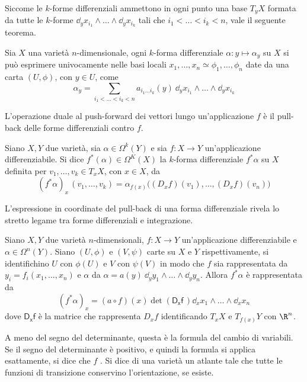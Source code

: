 Siccome le $k$-forme differenziali ammettono in ogni punto una base $T_y X$ formata da tutte le $k$-forme $\dd_y x_{i_1} \wedge \ldots \wedge \dd_y x_{i_k}$ tali che $i_1 < \ldots < i_k < n$, vale il seguente teorema.
\begin{theorem}
  Sia $X$ una varietà $n$-dimensionale, ogni $k$-forma differenziale $\alpha: y \mapsto \alpha_y$ su $X$ si può esprimere univocamente nelle basi locali $x_1, \ldots, x_n \simeq \phi_1, \ldots, \phi_n$ date da una carta $(U, \phi)$, con $y \in U$, come 
  \begin{equation*}
    \alpha_y = \sum_{i_1 < \ldots < i_k < n} a_{i_1\ldots i_k}(y)\ \dd_y x_{i_1} \wedge \ldots \wedge \dd_y x_{i_k}
  \end{equation*}
\end{theorem}

L'operazione duale al push-forward dei vettori lungo un'applicazione $f$ è il pull-back delle forme differenziali contro $f$.
\begin{definition}
  Siano $X,Y$ due varietà, sia $\alpha \in \Omega^k (Y)$ e sia $f:X\to Y$ un'applicazione differenziabile. Si dice  $f^*(\alpha) \in  \Omega^K(X)$ la $k$-forma differenziale $f^* \alpha$ su $X$ definita per $v_1, \ldots, v_k \in T_x X$, con $x \in X$, da \begin{equation*}
  (f^*\alpha)_x\, (v_1, \ldots, v_k) = \alpha_{f(x)}\big((D_x f)(v_1), \ldots, (D_x f)(v_n)\big)
  \end{equation*}  
\end{definition}

L'espressione in coordinate del pull-back di una forma differenziale rivela lo stretto legame tra forme differenziali e integrazione.
\begin{theorem} \label{thm:varChange}
  Siano $X,Y$ due varietà $n$-dimensionali, $f:X\to Y$ un'applicazione differenziabile e $\alpha \in  \Omega^n(Y)$. Siano $(U, \phi)$ e $(V,\psi)$ carte su $X$ e $Y$ rispettivamente, si identifichino $U$ con $\phi(U)$ e $V$ con $\psi(V)$ in modo che $f$ sia rappresentata da $y_i = f_i(x_1, \ldots, x_n)$ e $\alpha$ da $\alpha = a(y)\ \dd_y y_1\wedge \ldots \wedge \dd_y y_n$. Allora $f^* \alpha$ è rappresentata da \begin{equation*}
  (f^* \alpha)_x = (a \circ f)(x) \det(\mathsf{D_x f}\,)\dd_x x_1 \wedge \ldots \wedge \dd_x x_n
  \end{equation*}
  dove $\mathsf{D_x f}$ è la matrice che rappresenta $D_x f$ identificando $T_x X$ e $T_{f(x)}Y$ con $\R^{n}$.
\end{theorem}
\begin{remark}
  A meno del segno del determinante, questa è la formula del cambio di variabili. Se il segno del determinante è positivo, e quindi la formula si applica esattamente, si dice che $f$ . Si dice  di una varietà un atlante tale che tutte le funzioni di transizione conservino l'orientazione, se esiste.
\end{remark}

